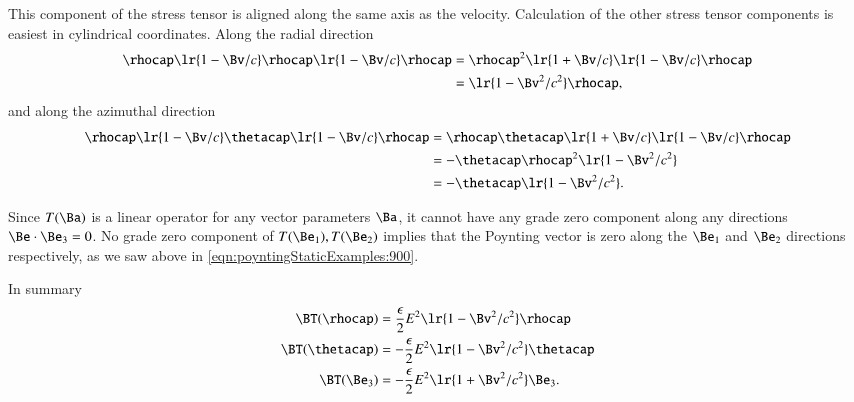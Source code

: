 This component of the stress tensor is aligned along the same axis as the velocity.
Calculation of the other stress tensor components is easiest in cylindrical coordinates.  Along the radial direction
\begin{dmath}\label{eqn:poyntingStaticExamples:1020}
\begin{aligned}
\rhocap \lr{ 1 - \Bv/c } \rhocap \lr{1 - \Bv/c} \rhocap
&=
\rhocap^2 \lr{ 1 + \Bv/c} \lr{1 - \Bv/c} \rhocap \\
&= \lr{1 - \Bv^2/c^2} \rhocap,
\end{aligned}
\end{dmath}
and along the azimuthal direction
\begin{dmath}\label{eqn:poyntingStaticExamples:1100}
\begin{aligned}
\rhocap \lr{ 1 - \Bv/c } \thetacap \lr{1 - \Bv/c} \rhocap
&=
\rhocap \thetacap \lr{1 + \Bv/c} \lr{1 - \Bv/c} \rhocap \\
&=
-\thetacap \rhocap^2 \lr{1 - \Bv^2/c^2} \\
&=
-\thetacap \lr{1 - \Bv^2/c^2}.
\end{aligned}
\end{dmath}

Since \( T(\Ba) \) is a linear operator for any vector parameters \( \Ba \), it cannot have any grade zero component along any directions \( \Be \cdot \Be_3 = 0 \).
No grade zero component of \( T(\Be_1), T(\Be_2) \) implies that the Poynting vector is zero along the \( \Be_1 \) and \( \Be_2 \) directions respectively, as we saw above in
\cref{eqn:poyntingStaticExamples:900}.
%
%
%

In summary
\begin{dmath}\label{eqn:poyntingStaticExamples:1080}
\begin{aligned}
\BT(\rhocap) &= \frac{\epsilon}{2} E^2 \lr{1 -\Bv^2/c^2} \rhocap \\
\BT(\thetacap) &= -\frac{\epsilon}{2} E^2 \lr{1 -\Bv^2/c^2} \thetacap \\
\BT(\Be_3) &= -\frac{\epsilon}{2} E^2 \lr{1 + \Bv^2/c^2 } \Be_3.
\end{aligned}
\end{dmath}

